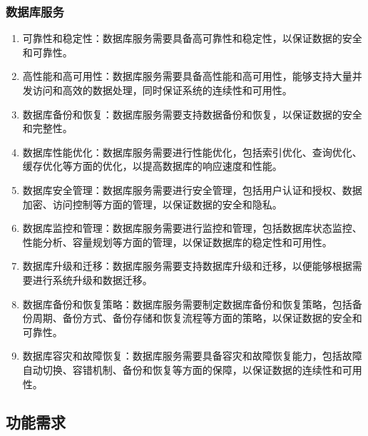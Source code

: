 \documentclass[UTF8]{ctexart}
\newcommand{\m}[1]{\textcolor{modify}{#1}}
\begin{document}
    \subsubsection{数据库服务}
    \m{
        \begin{enumerate}
            \item 可靠性和稳定性：数据库服务需要具备高可靠性和稳定性，以保证数据的安全和可靠性。
            \item 高性能和高可用性：数据库服务需要具备高性能和高可用性，能够支持大量并发访问和高效的数据处理，同时保证系统的连续性和可用性。
            \item 数据库备份和恢复：数据库服务需要支持数据备份和恢复，以保证数据的安全和完整性。
            \item 数据库性能优化：数据库服务需要进行性能优化，包括索引优化、查询优化、缓存优化等方面的优化，以提高数据库的响应速度和性能。
            \item 数据库安全管理：数据库服务需要进行安全管理，包括用户认证和授权、数据加密、访问控制等方面的管理，以保证数据的安全和隐私。
            \item 数据库监控和管理：数据库服务需要进行监控和管理，包括数据库状态监控、性能分析、容量规划等方面的管理，以保证数据库的稳定性和可用性。
            \item 数据库升级和迁移：数据库服务需要支持数据库升级和迁移，以便能够根据需要进行系统升级和数据迁移。
            \item 数据库备份和恢复策略：数据库服务需要制定数据库备份和恢复策略，包括备份周期、备份方式、备份存储和恢复流程等方面的策略，以保证数据的安全和可靠性。
            \item 数据库容灾和故障恢复：数据库服务需要具备容灾和故障恢复能力，包括故障自动切换、容错机制、备份和恢复等方面的保障，以保证数据的连续性和可用性。
        \end{enumerate}
    }
    
    \subsection{功能需求}
\end{document}
